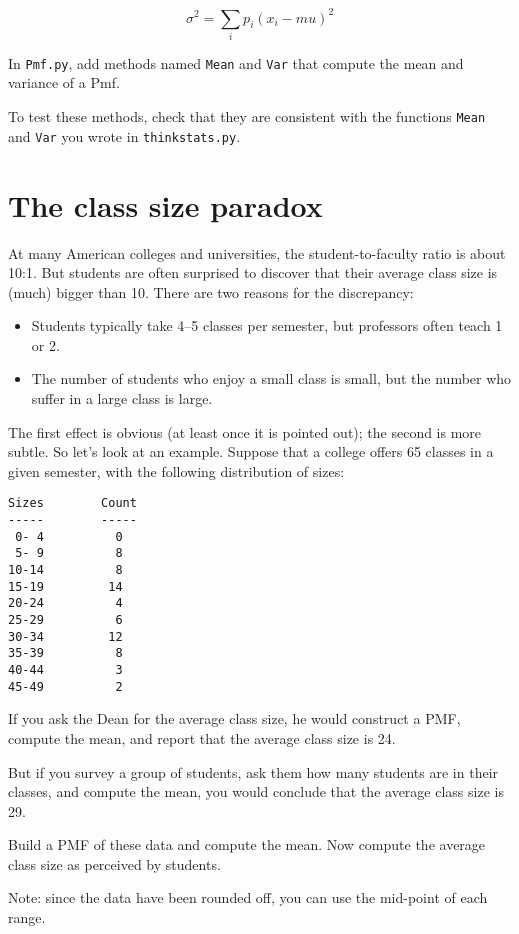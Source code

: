 \documentclass[10pt]{book}
\begin{document}
\[ \sigma^2 = \sum_i p_i (x_i - mu)^2\]

\begin{ex}
In {\tt Pmf.py}, add methods named {\tt Mean} and {\tt Var} that compute
the mean and variance of a Pmf.

To test these methods, check that they are consistent with the
functions {\tt Mean} and {\tt Var} you wrote in {\tt thinkstats.py}.
\end{ex}


\section{The class size paradox}

At many American colleges and universities, the student-to-faculty
ratio is about 10:1.  But students are often surprised to discover
that their average class size is (much) bigger than 10.  There
are two reasons for the discrepancy:

\begin{itemize}

\item Students typically take 4--5 classes per semester, but
professors often teach 1 or 2.

\item The number of students who enjoy a small class is small,
but the number who suffer in a large class is large.

\end{itemize}

The first effect is obvious (at least once it is pointed out);
the second is more subtle.  So let's look at an example.  Suppose
that a college offers 65 classes in a given semester, with the
following distribution of sizes:

\begin{verbatim}
Sizes        Count
-----        -----
 0- 4          0
 5- 9          8
10-14          8
15-19         14
20-24          4
25-29          6
30-34         12
35-39          8
40-44          3
45-49          2
\end{verbatim}

If you ask the Dean for the average class size, he would
construct a PMF, compute the mean, and report that the
average class size is 24.

But if you survey a group of students, ask them how many
students are in their classes, and compute the mean, you would
conclude that the average class size is 29.

\begin{ex}
Build a PMF of these data and compute the mean.  Now compute the
average class size as perceived by students.

Note: since the data have been rounded off, you can use the mid-point
of each range.  
\end{ex}
\end{document}
